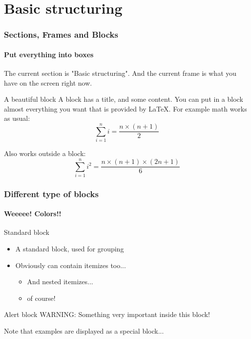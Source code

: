 \documentclass[12pt]{beamer}
\begin{document}
\section{Basic structuring}
\begin{frame}
  \frametitle{Sections, Frames and Blocks}
  \framesubtitle{Put everything into boxes}

  The current section is "Basic structuring". And the current frame
  is what you have on the screen right now.

  \begin{block}{A beautiful block}
  A block has a title, and some content. You can put in a block
  almost everything you want that is provided by LaTeX. For example
  math works as usual:
    \begin{equation}
    \sum_{i=1}^n i = \frac{n \times (n+1)}{2}
    \end{equation}
  \end{block}

  Also works outside a block:
  \begin{equation}
  \sum_{i=1}^n i^2 = \frac{n \times (n+1) \times (2n+1)}{6}
  \end{equation}
\end{frame}

\begin{frame}
  \frametitle{Different type of blocks}
  \framesubtitle{Weeeee! Colors!!}
  \begin{block}{Standard block}
  \begin{itemize}
    \item A standard block, used for grouping
    \item Obviously can contain itemizes too...
    \begin{itemize}
      \item And nested itemizes...
      \item of course!
    \end{itemize}
  \end{itemize}
  \end{block}
  \begin{alertblock}{Alert block}
  WARNING: Something very important inside this block!
  \end{alertblock}
  \begin{example}
  Note that examples are displayed as a special block...
  \end{example}
\end{frame}
\end{document}
